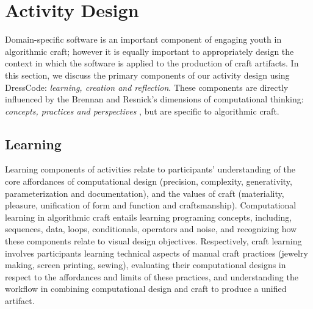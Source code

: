 \documentclass{sigchi}
\begin{document}
\section{Activity Design}
Domain-specific software is an important component of engaging youth in algorithmic craft; however it is equally important to appropriately design the context in which the software is applied to the production of craft artifacts. In this section, we discuss the primary components of our activity design using DressCode: \emph{learning, creation and reflection}. These components are directly influenced by the Brennan and Resnick's dimensions of computational thinking: \emph{concepts, practices and perspectives} \cite{computational_thinking}, but are specific to algorithmic craft.

\subsection{Learning}
Learning components of activities relate to participants' understanding of the core affordances of computational design (precision, complexity, generativity, parameterization and documentation), and the values of craft (materiality, pleasure, unification of form and function and craftsmanship). Computational learning in algorithmic craft entails learning programing concepts\cite{computational_thinking}, including, sequences, data, loops, conditionals, operators and noise, and recognizing how these components relate to visual design objectives. Respectively, craft learning involves participants learning technical aspects of manual craft practices (jewelry making, screen printing, sewing), evaluating their computational designs in respect to the affordances and limits of these practices, and understanding the workflow in combining computational design and craft to produce a unified artifact. 
\end{document}
